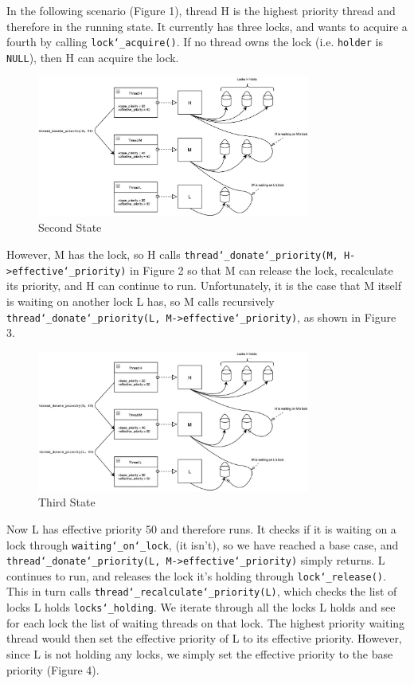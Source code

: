 \documentclass{article}
\renewcommand{\_}{\char`_}
\begin{document}
In the following scenario (Figure 1), thread H is the highest priority thread and therefore in the running state. It currently has three locks, and wants to acquire a fourth by calling \texttt{lock\_acquire()}. If no thread owns the lock (i.e. \texttt{holder} is \texttt{NULL}), then H can acquire the lock. 

\begin{figure}[ht!]
\centering
\hspace{3em}
\includegraphics[width=0.8\textwidth]{Images/Task1/2Nested}
\caption{Second State}
\end{figure}

However, M has the lock, so H calls \texttt{thread\_donate\_priority(M, H->effective\_priority)} in Figure 2 so that M can release the lock, recalculate its priority, and H can continue to run. Unfortunately, it is the case that M itself is waiting on another lock L has, so M calls recursively \texttt{thread\_donate\_priority(L, M->effective\_priority)}, as shown in Figure 3.
\newpage

\begin{figure}[ht!]
\centering
\hspace{3em}
\includegraphics[width=0.8\textwidth]{Images/Task1/3Nested}
\caption{Third State}
\end{figure}

Now L has effective priority 50 and therefore runs. It checks if it is waiting on a lock through \texttt{waiting\_on\_lock}, (it isn't), so we have reached a base case, and \texttt{thread\_donate\_priority(L, M->effective\_priority)} simply returns. L continues to run, and releases the lock it's holding through \texttt{lock\_release()}. This in turn calls \texttt{thread\_recalculate\_priority(L)}, which checks the list of locks L holds \texttt{locks\_holding}. We iterate through all the locks L holds and see for each lock the list of waiting threads on that lock. The highest priority waiting thread would then set the effective priority of L to its effective priority. However, since L is not holding any locks, we simply set the effective priority to the base priority (Figure 4). 
\end{document}
